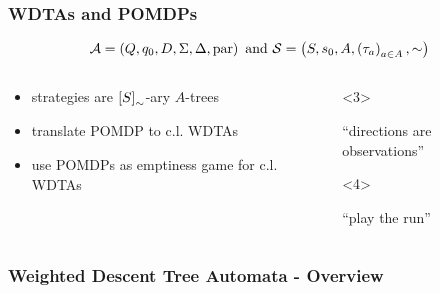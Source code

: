 \documentclass{beamer}
\begin{document}
  \begin{frame}
    \frametitle{\acp{WDTA} and \acp{POMDP}}
    \begin{equation*}
      \mathcal{A} = \left(Q, q_{0}, D, \Sigma, \Delta, \operatorname{par}\right)
      \text{ and }
      \mathcal{S} = \left(S, s_{0}, A, \left(\tau_{a}\right)_{a\in A}, \sim\right)
    \end{equation*}
    \begin{overlayarea}{\textwidth}{0.8\textheight}
      \begin{columns}
        \begin{column}{0.35\textwidth}
          \begin{overlayarea}{\textwidth}{\textheight}
            \begin{itemize}
              \item<2-> strategies are
                $\left[S\right]_{\sim}$-ary $A$-trees
              \item<3-> translate \acs{POMDP} to c.l. \acp{WDTA}
              \item<4-> use \acp{POMDP} as emptiness game for c.l. \acp{WDTA}
            \end{itemize}
          \end{overlayarea}
        \end{column}
        \begin{column}{0.65\textwidth}
          \vspace{-3cm}
          \begin{onlyenv}<3>
            \begin{center}
              \enquote{directions are observations}
            \end{center}
          \end{onlyenv}
          \begin{onlyenv}<4>
            \begin{center}
              \enquote{play the run}
            \end{center}
          \end{onlyenv}
        \end{column}
      \end{columns}
    \end{overlayarea}
  \end{frame}

  \begin{frame}
    \frametitle{Weighted Descent Tree Automata - Overview}
  \end{frame}
\end{document}
